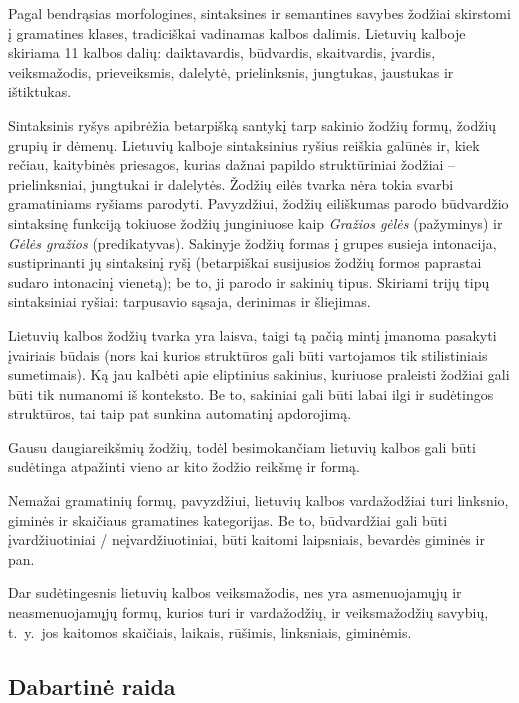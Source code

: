 \begin{multicols}{2}
Pagal bendrąsias morfologines, sintaksines ir semantines savybes žodžiai skirstomi į gramatines klases, tradiciškai vadinamas kalbos dalimis. Lietuvių kalboje skiriama 11 kalbos dalių: daiktavardis, būdvardis, skaitvardis, įvardis, veiksmažodis, prieveiksmis, dalelytė, prielinksnis, jungtukas, jaustukas ir ištiktukas.

Sintaksinis ryšys apibrėžia betarpišką santykį tarp sakinio žodžių formų, žodžių grupių ir dėmenų. Lietuvių kalboje sintaksinius ryšius reiškia galūnės ir, kiek rečiau, kaitybinės priesagos, kurias dažnai papildo struktūriniai žodžiai – prielinksniai, jungtukai ir dalelytės. Žodžių eilės tvarka nėra tokia svarbi gramatiniams ryšiams parodyti. Pavyzdžiui, žodžių eiliškumas parodo būdvardžio sintaksinę funkciją tokiuose žodžių junginiuose kaip  \textit{Gražios gėlės} (pažyminys) ir  \textit{Gėlės gražios} (predikatyvas). Sakinyje žodžių formas į grupes susieja intonacija, sustiprinanti jų sintaksinį ryšį (betarpiškai susijusios žodžių formos paprastai sudaro intonacinį vienetą); be to, ji parodo ir sakinių tipus. Skiriami trijų tipų sintaksiniai ryšiai: tarpusavio sąsaja, derinimas ir šliejimas.

Lietuvių kalbos žodžių tvarka yra laisva, taigi tą pačią mintį įmanoma pasakyti įvairiais būdais (nors kai kurios struktūros gali būti vartojamos tik stilistiniais sumetimais). Ką jau kalbėti apie eliptinius sakinius, kuriuose praleisti žodžiai gali būti tik numanomi iš konteksto. Be to, sakiniai gali būti labai ilgi ir sudėtingos struktūros, tai taip pat sunkina automatinį apdorojimą.

Gausu daugiareikšmių žodžių, todėl besimokančiam lietuvių kalbos gali būti sudėtinga atpažinti vieno ar kito žodžio reikšmę ir formą.

Nemažai gramatinių formų, pavyzdžiui, lietuvių kalbos vardažodžiai turi linksnio, giminės ir skaičiaus gramatines kategorijas. Be to, būdvardžiai gali būti įvardžiuotiniai / neįvardžiuotiniai, būti kaitomi laipsniais, bevardės giminės ir pan.

Dar sudėtingesnis lietuvių kalbos veiksmažodis, nes yra asmenuojamųjų ir neasmenuojamųjų formų, kurios turi ir vardažodžių, ir veiksmažodžių savybių, t.~y.~jos kaitomos skaičiais, laikais, rūšimis, linksniais, giminėmis.


\subsection{Dabartinė raida}


\end{multicols}
